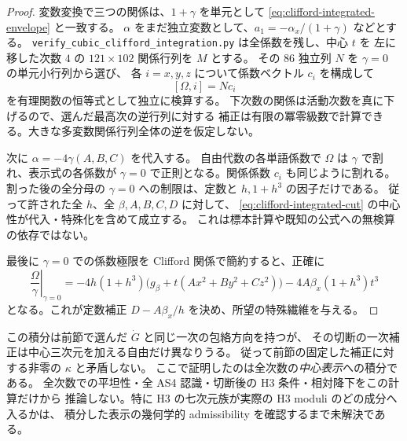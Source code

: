 \begin{proof}
変数変換で三つの関係は、$1+\gamma$ を単元として
\eqref{eq:clifford-integrated-envelope} と一致する。
$\alpha$ をまだ独立変数として、$a_1=-\alpha_x/(1+\gamma)$ などとする。
\texttt{verify\_cubic\_clifford\_integration.py} は全係数を残し、中心 $t$ を
左に移した次数 $4$ の $121\times102$ 関係行列を $M$ とする。
その $86$ 独立列 $N$ を $\gamma=0$ の単元小行列から選び、
各 $i=x,y,z$ について係数ベクトル $c_i$ を構成して
\[
 [\Omega,i]=Nc_i
\]
を有理関数の恒等式として独立に検算する。
下次数の関係は活動次数を真に下げるので、選んだ最高次の逆行列に対する
補正は有限の冪零級数で計算できる。大きな多変数関係行列全体の逆を仮定しない。

次に $\alpha=-4\gamma(A,B,C)$ を代入する。
自由代数の各単語係数で $\Omega$ は $\gamma$ で割れ、表示式の各係数が
$\gamma=0$ で正則となる。関係係数 $c_i$ も同じように割れる。
割った後の全分母の $\gamma=0$ への制限は、定数と $h,1+h^3$ の因子だけである。
従って許された全 $h$、全 $\beta,A,B,C,D$ に対して、
\eqref{eq:clifford-integrated-cut} の中心性が代入・特殊化を含めて成立する。
これは標本計算や既知の公式への無検算の依存ではない。

最後に $\gamma=0$ での係数極限を Clifford 関係で簡約すると、正確に
\[
 \left.\frac{\Omega}{\gamma}\right|_{\gamma=0}
 =-4h(1+h^3)\bigl(g_\beta+t(Ax^2+By^2+Cz^2)\bigr)
   -4A\beta_x(1+h^3)t^3
\]
となる。これが定数補正 $D-A\beta_x/h$ を決め、所望の特殊繊維を与える。
\end{proof}

この積分は前節で選んだ $\dot G$ と同じ一次の包絡方向を持つが、
その切断の一次補正は中心三次元を加える自由だけ異なりうる。
従って前節の固定した補正に対する非零の $\kappa$ と矛盾しない。
ここで証明したのは全次数の\emph{中心表示}への積分である。
全次数での平坦性・全 AS4 認識・切断後の H3 条件・相対降下をこの計算だけから
推論しない。特に H3 の七次元族が実際の H3 moduli のどの成分へ入るかは、
積分した表示の幾何学的 admissibility を確認するまで未解決である。
